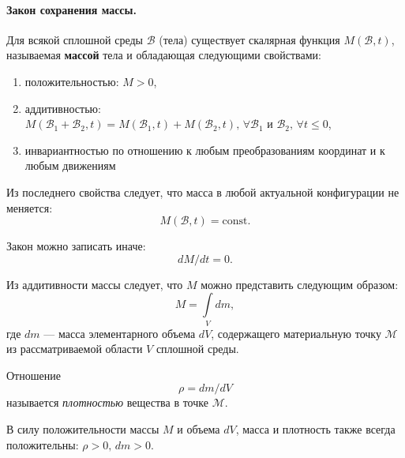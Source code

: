 
\paragraph{Закон сохранения массы.} 
\begin{axiom*}
	Для всякой сплошной среды $\mathcal{B}$ (тела) существует скалярная функция $M(\mathcal{B}, t)$, называемая \textbf{массой} тела и обладающая следующими свойствами:
	\begin{enumerate}
		\item положительностью: $M > 0$,
		
		\item аддитивностью: $M(\mathcal{B}_1 + \mathcal{B}_2, t) = M(\mathcal{B}_1, t) + M(\mathcal{B}_2, t), \, \forall \mathcal{B}_1 \text{ и } \mathcal{B}_2, \, \forall t \leqslant 0$,
		
		\item инвариантностью по отношению к любым преобразованиям координат и к любым движениям  
	\end{enumerate}
	
	Из последнего свойства следует, что масса в любой актуальной конфигурации не меняется:
	\begin{equation*}
		M(\mathcal{B}, t) = \mathrm{const}.
	\end{equation*}
\end{axiom*}

\begin{remark*}
	Закон можно записать иначе: 
	\begin{equation*}
		dM / dt = 0.
	\end{equation*}
	
	Из аддитивности массы следует, что $M$ можно представить следующим образом:
	\begin{equation*}
		M = \int \limits_{V} dm, 
	\end{equation*}
	где $dm$ --- масса элементарного объема $dV$, содержащего материальную точку $\mathcal{M}$ из рассматриваемой области $V$ сплошной среды.
\end{remark*}

\begin{definition*}
	Отношение 
	\begin{equation*}
		\rho = dm / dV
	\end{equation*}
	называется \textit{плотностью} вещества в точке $\mathcal{M}$. 
	
	В силу положительности массы $M$ и объема $dV$, масса и плотность также всегда положительны: $\rho > 0, \, dm > 0$. 
\end{definition*}

